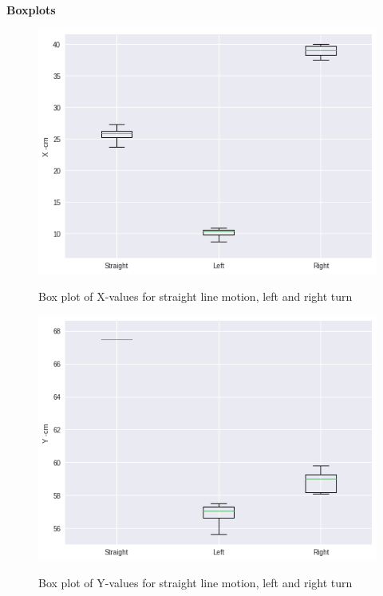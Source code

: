 \documentclass[11pt,a4paper]{article}
\begin{document}
	
	
	
	\textbf{Boxplots}
	\begin{figure}[H]
		\centering
		\includegraphics[width=1.0\linewidth]{boxplot-x}
		\label{fig:box-x}
		\caption{Box plot of X-values for straight line motion, left and right turn}
	\end{figure}
	
	\begin{figure}[H]
		\centering	
		\includegraphics[width=1.0\linewidth]{boxplot-y}
		\label{fig:box-y}
		\caption{Box plot of Y-values for straight line motion, left and right turn}
	\end{figure}
	
\end{document}
